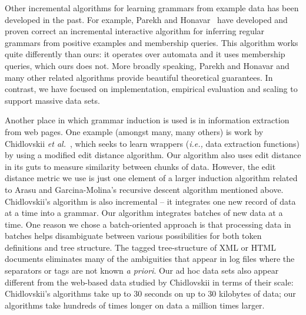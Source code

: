 Other incremental algorithms for learning grammars from example data
has been developed in the past.  For example, Parekh and 
Honavar~\cite{parekh+:incremental} have developed and proven correct
an incremental interactive algorithm for inferring
regular grammars from positive examples and membership queries.
This algorithm works quite differently than ours:  it operates over
automata and it uses membership queries, which ours does not.
More broadly speaking, Parekh and Honavar and many other related algorithms
provide beautiful theoretical guarantees.  In contrast, we have
focused on implementation, empirical 
evaluation and scaling to support massive data sets.

Another place in which grammar induction is used is in information
extraction from web pages.  One example (amongst many, many others) is
work by Chidlovskii {\em et al.}~\cite{chidlovskii+:wrapper-generation},
which seeks to learn wrappers ({\em i.e.,} data extraction functions)
by using a modified edit distance algorithm.  Our algorithm also
uses edit distance in its guts to measure similarity
between chunks of data.  However, the edit distance metric we use is just
one element of a larger induction algorithm related to Arasu and
Garcina-Molina's recursive descent algorithm mentioned above.
Chidlovskii's algorithm is also incremental -- it
integrates one new record of data at a time into a grammar.
Our algorithm integrates batches of new data at a time.  One
reason we chose a batch-oriented approach is that processing
data in batches helps
disambiguate between various possibilities for both token
definitions and tree structure.  The tagged tree-structure of
XML or HTML documents eliminates many of the ambiguities that
appear in log files where the separators or tags are not known
{\em a priori}.  Our ad hoc data sets also appear different
from the web-based data studied by Chidlovskii in terms of their
scale:  Chidlovskii's algorithms take up to
30 seconds on up to 30 kilobytes of data; our algorithms 
take hundreds of times longer on data a million times larger.

